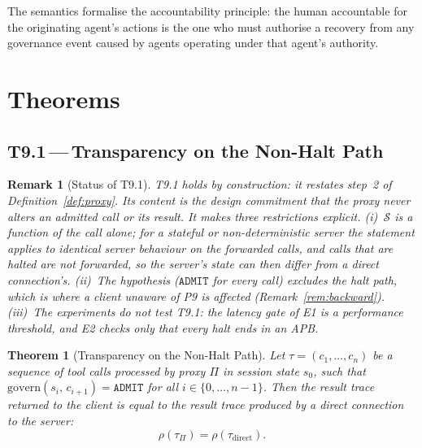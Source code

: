 \documentclass[11pt]{article}
\newtheorem{theorem}{Theorem}[section]
\newtheorem{remark}{Remark}[section]
\newcommand{\ADMIT}{\texttt{ADMIT}}
\newcommand{\Proxy}{\Pi}
\begin{document}
The semantics formalise the accountability principle: the human
accountable for the originating agent's actions is the one who must
authorise a recovery from any governance event caused by agents
operating under that agent's authority.

\section{Theorems}
\label{sec:theorems}

\subsection{T9.1\,---\,Transparency on the Non-Halt Path}
\label{sec:t91}

\begin{remark}[Status of T9.1]
T9.1 holds \emph{by construction}: it restates step~2 of
Definition~\ref{def:proxy}. Its content is the design commitment that
the proxy never alters an admitted call or its result. It makes three
restrictions explicit. (i)~$\mathcal{S}$ is a function of the call alone;
for a stateful or non-deterministic server the statement applies to
\emph{identical server behaviour} on the forwarded calls, and calls that
are halted are \emph{not} forwarded, so the server's state can then
differ from a direct connection's. (ii)~The hypothesis ($\ADMIT$ for
every call) excludes the halt path, which is where a client unaware of
P9 is affected (Remark~\ref{rem:backward}). (iii)~The experiments do not
test T9.1: the latency gate of E1 is a performance threshold, and E2
checks only that every halt ends in an APB.
\end{remark}

\begin{theorem}[Transparency on the Non-Halt Path]
\label{thm:transparency}
Let $\tau = (c_1, \ldots, c_n)$ be a sequence of tool calls processed
by proxy $\Proxy$ in session state $s_0$, such that
$\mathrm{govern}(s_i,\,c_{i+1}) = \ADMIT$ for all $i \in \{0,\ldots,n-1\}$.
Then the result trace returned to the client is equal to the result
trace produced by a direct connection to the server:
\[
  \rho(\tau_\Proxy) = \rho(\tau_\text{direct}).
\]
\end{theorem}
\end{document}
